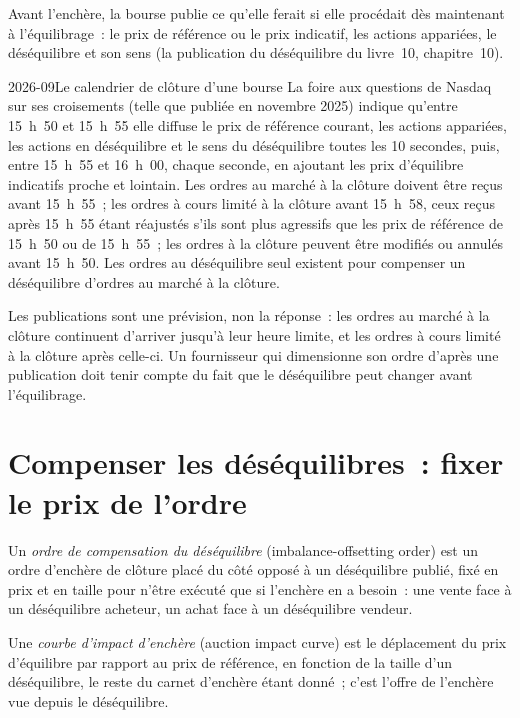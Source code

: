 Avant l'enchère, la bourse publie ce qu'elle ferait si elle procédait dès maintenant à l'équilibrage~: le prix de référence ou le prix indicatif, les actions appariées, le
déséquilibre et son sens (la publication du déséquilibre du livre~10, chapitre~10).

\begin{dated}{2026-09}{Le calendrier de clôture d'une bourse}\label{dat:hf:auctions-and-the-close:nasdaq}
La foire aux questions de Nasdaq sur ses croisements (telle que publiée en novembre 2025) indique qu'entre 15~h~50 et 15~h~55 elle diffuse le
prix de référence courant, les actions appariées, les actions en déséquilibre et le sens du déséquilibre toutes les 10 secondes, puis, entre 15~h~55 et 16~h~00, chaque seconde, en ajoutant
les prix d'équilibre indicatifs proche et lointain. Les ordres au marché à la clôture doivent être reçus avant 15~h~55~; les ordres à cours limité à la clôture avant 15~h~58, ceux
reçus après 15~h~55 étant réajustés s'ils sont plus agressifs que les prix de référence de 15~h~50 ou de 15~h~55~; les ordres à la clôture peuvent être modifiés ou annulés avant 15~h~50.
Les ordres au déséquilibre seul existent pour compenser un déséquilibre d'ordres au marché à la clôture.
\end{dated}

Les publications sont une prévision, non la réponse~: les ordres au marché à la clôture continuent d'arriver jusqu'à leur heure limite, et les ordres à cours limité à la clôture après celle-ci. Un
fournisseur qui dimensionne son ordre d'après une publication doit tenir compte du fait que le déséquilibre peut changer avant l'équilibrage.

\section{Compenser les déséquilibres~: fixer le prix de l'ordre}

\begin{definition}\label{def:hf:auctions-and-the-close:offset}
Un \emph{ordre de compensation du déséquilibre} (imbalance-offsetting order) est un ordre d'enchère de clôture placé du côté opposé à un déséquilibre publié,
fixé en prix et en taille pour n'être exécuté que si l'enchère en a besoin~: une vente face à un déséquilibre acheteur, un achat face à un déséquilibre vendeur.
\end{definition}

\begin{definition}\label{def:hf:auctions-and-the-close:impact}
Une \emph{courbe d'impact d'enchère} (auction impact curve) est le déplacement du prix d'équilibre par rapport au prix de référence, en fonction de la taille d'un
déséquilibre, le reste du carnet d'enchère étant donné~; c'est l'offre de l'enchère vue depuis le déséquilibre.
\end{definition}

